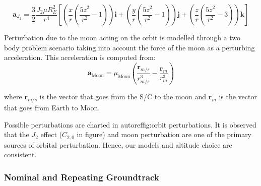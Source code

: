 \begin{equation}
	\mathbf{a}_{J_2} = \frac{3}{2} \frac{J_2 \mu R_E^2}{r^4} \left[ \left( \frac{x}{r} \left( \frac{5z^2}{r^2} - 1 \right) \right) \mathbf{i} + \left( \frac{y}{r} \left( \frac{5z^2}{r^2} - 1 \right) \right) \mathbf{j} + \left( \frac{z}{r} \left( \frac{5z^2}{r^2} - 3 \right) \right) \mathbf{k} \right]
\end{equation}

Perturbation due to the moon acting on the orbit is modelled through a two body problem scenario taking into account the force of the moon as a perturbing acceleration. This acceleration is computed from:
\begin{equation}
	\label{eq:moon_perturbation}
	\mathbf{a}_{\text{Moon}} = \mu_{\text{Moon}}
	\left( \frac{\mathbf{r}_{m/s}}{r_{m/s}^3} - \frac{\mathbf{r}_m}{r_m^3} \right)
\end{equation}

where \( \mathbf{r}_{m/s} \) is the vector that goes from the S/C to the moon and \( \mathbf{r}_m \) is the vector that goes from Earth to Moon.

Possible perturbations are charted in autoref{fig:orbit perturbations}. It is observed that the \( J_2 \) effect (\( C_{2,0} \) in figure) and moon perturbation are one of the primary sources of orbital perturbation. Hence, our models and altitude choice are consistent.   



\subsubsection{Nominal and Repeating Groundtrack}

